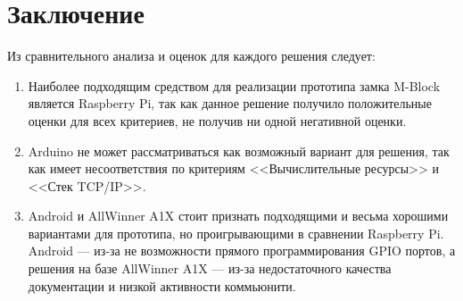 \documentclass[twoside,a4paper]{msmb} %
\begin{document}
\section{Заключение}
Из сравнительного анализа и оценок для каждого решения следует:

\begin{enumerate}

\item Наиболее подходящим средством для реализации прототипа замка M-Block является Raspberry Pi, так как данное решение получило положительные оценки для всех критериев, не получив ни одной негативной оценки. 

\item Arduino не может рассматриваться как возможный вариант для решения, так как имеет несоответствия по критериям <<Вычислительные ресурсы>> и <<Стек TCP/IP>>. 

\item Android и AllWinner A1X стоит признать подходящими и весьма хорошими вариантами для прототипа, но проигрывающими в сравнении Raspberry Pi. Android --- из-за не возможности прямого программирования GPIO портов, а решения на базе AllWinner A1X --- из-за недостаточного качества документации и низкой активности коммьюнити.

\end{enumerate}

\end{document}
